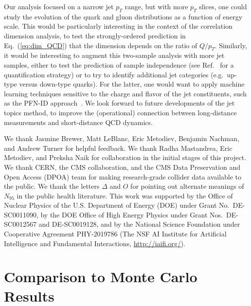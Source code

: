 \documentclass[aps,prd,twocolumn,preprintnumbers,nofootinbib,longbibliography,floatfix]{revtex4-1}
\DeclareRobustCommand{\Fig}[1]{Fig.~\ref{#1}}
\DeclareRobustCommand{\Eq}[1]{Eq.~(\ref{#1})}
\DeclareRobustCommand{\Ref}[1]{Ref.~\cite{#1}}
\newcommand{\Pythia}{{\sc Pythia}\xspace}
\begin{document}
Our analysis focused on a narrow jet $p_T$ range, but with more $p_T$ slices, one could study the evolution of the quark and gluon distributions as a function of energy scale.
%
This would be particularly interesting in the context of the correlation dimension analysis, to test the strongly-ordered prediction in \Eq{eq:dim_QCD} that the dimension depends on the ratio of $Q/p_T$.
%
Similarly, it would be interesting to augment this two-sample analysis with more jet samples, either to test the prediction of sample independence (see \Ref{Komiske:2018vkc} for a quantification strategy) or to try to identify additional jet categories (e.g.\ up-type versus down-type quarks).
%
For the latter, one would want to apply machine learning techniques sensitive to the charge and flavor of the jet constituents, such as the PFN-ID approach~\cite{Komiske:2018cqr}.
%
We look forward to future developments of the jet topics method, to improve the (operational) connection between long-distance measurements and short-distance QCD dynamics.


\begin{acknowledgments}
%
We thank Jasmine Brewer, Matt LeBlanc, Eric Metodiev, Benjamin Nachman, and Andrew Turner for helpful feedback.
%
We thank Radha Mastandrea, Eric Metodiev, and Preksha Naik for collaboration in the initial stages of this project.
%
We thank CERN, the CMS collaboration, and the CMS Data Preservation and Open Access (DPOA) team for making research-grade collider data available to the public.
%
We thank the letters $\Delta$ and $O$ for pointing out alternate meanings of $N_{95}$ in the public health literature.
%
This work was supported by the Office of Nuclear Physics of the U.S. Department of Energy (DOE) under Grant No.\ DE-SC0011090, by the DOE Office of High Energy Physics under Grant Nos.\ DE-SC0012567 and DE-SC0019128, and by the National Science Foundation under Cooperative Agreement PHY-2019786 (The NSF AI Institute for Artificial Intelligence and Fundamental Interactions, \url{http://iaifi.org/}).
%
\end{acknowledgments}

\appendix

\section{Comparison to Monte Carlo Results}
\label{sec:pythia_only_analysis}

\begin{figure*}[t]
	\caption{
	Same as \Fig{fig:all_results} but applied to the \Pythia 6.4.25 dataset.  Interestingly, the extracted anchor values for the benchmark method in red does not match the horizontal dashed \Pythia parton-level expectation from \Eq{eq:frac_exp_pythia}.
	}
	\label{fig:pythia_red_fac_results}
\end{figure*}
\end{document}
